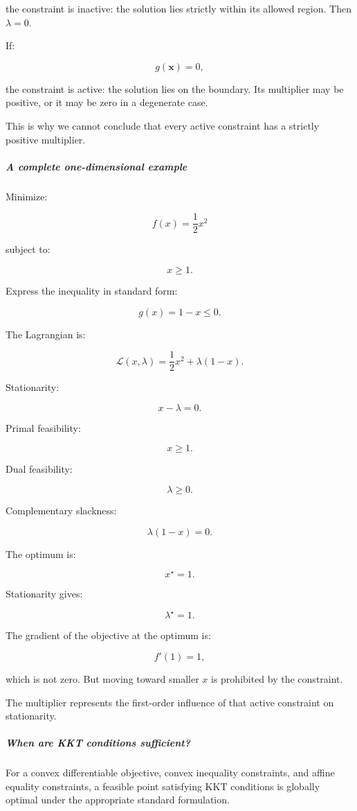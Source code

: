 the constraint is inactive: the solution lies strictly within its allowed region. Then \(\lambda=0\).

If:

\[
g(\mathbf x)=0,
\]

the constraint is active: the solution lies on the boundary. Its multiplier may be positive, or it may be zero in a degenerate case.

This is why we cannot conclude that every active constraint has a strictly positive multiplier.

\subparagraph{A complete one-dimensional example}\label{a-complete-one-dimensional-example}

Minimize:

\[
f(x)=\frac12x^2
\]

subject to:

\[
x\ge1.
\]

Express the inequality in standard form:

\[
g(x)=1-x\le0.
\]

The Lagrangian is:

\[
\mathcal L(x,\lambda) = \frac12x^2+\lambda(1-x).
\]

Stationarity:

\[
x-\lambda=0.
\]

Primal feasibility:

\[
x\ge1.
\]

Dual feasibility:

\[
\lambda\ge0.
\]

Complementary slackness:

\[
\lambda(1-x)=0.
\]

The optimum is:

\[
\boxed{x^\star=1}.
\]

Stationarity gives:

\[
\boxed{\lambda^\star=1}.
\]

The gradient of the objective at the optimum is:

\[
f'(1)=1,
\]

which is not zero. But moving toward smaller \(x\) is prohibited by the constraint.

The multiplier represents the first-order influence of that active constraint on stationarity.

\subparagraph{When are KKT conditions sufficient?}\label{when-are-kkt-conditions-sufficient}

For a convex differentiable objective, convex inequality constraints, and affine equality constraints, a feasible point satisfying KKT conditions is globally optimal under the appropriate standard formulation.

